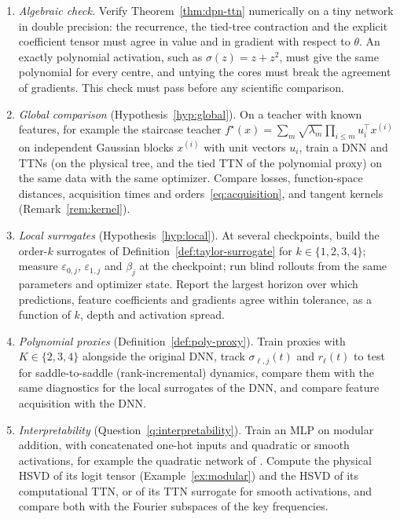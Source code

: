 \documentclass[11pt]{article}
\theoremstyle{definition}
\numberwithin{equation}{section}
\begin{document}
\begin{enumerate}[label=E\arabic*.,start=0,leftmargin=*]
\item \emph{Algebraic check.} Verify Theorem~\ref{thm:dpn-ttn} numerically on a tiny network in double precision: the recurrence, the tied-tree contraction and the explicit coefficient tensor must agree in value and in gradient with respect to $\theta$. An exactly polynomial activation, such as $\sigma(z)=z+z^2$, must give the same polynomial for every centre, and untying the cores must break the agreement of gradients. This check must pass before any scientific comparison.
\item \emph{Global comparison} (Hypothesis~\ref{hyp:global}). On a teacher with known features, for example the staircase teacher $f^\star(x)=\sum_m\sqrt{\lambda_m}\prod_{i\le m}u_i^\top x^{(i)}$ on independent Gaussian blocks $x^{(i)}$ with unit vectors $u_i$, train a DNN and TTNs (on the physical tree, and the tied TTN of the polynomial proxy) on the same data with the same optimizer. Compare losses, function-space distances, acquisition times and orders~\eqref{eq:acquisition}, and tangent kernels (Remark~\ref{rem:kernel}).
\item \emph{Local surrogates} (Hypothesis~\ref{hyp:local}). At several checkpoints, build the order-$k$ surrogates of Definition~\ref{def:taylor-surrogate} for $k\in\{1,2,3,4\}$; measure $\varepsilon_{0,j}$, $\varepsilon_{1,j}$ and $\beta_j$ at the checkpoint; run blind rollouts from the same parameters and optimizer state. Report the largest horizon over which predictions, feature coefficients and gradients agree within tolerance, as a function of $k$, depth and activation spread.
\item \emph{Polynomial proxies} (Definition~\ref{def:poly-proxy}). Train proxies with $K\in\{2,3,4\}$ alongside the original DNN, track $\sigma_{\ell,j}(t)$ and $r_\ell(t)$ to test for saddle-to-saddle (rank-incremental) dynamics, compare them with the same diagnostics for the local surrogates of the DNN, and compare feature acquisition with the DNN.
\item \emph{Interpretability} (Question~\ref{q:interpretability}). Train an MLP on modular addition, with concatenated one-hot inputs and quadratic or smooth activations, for example the quadratic network of \citet{gromov2023grokking}. Compute the physical HSVD of its logit tensor (Example~\ref{ex:modular}) and the HSVD of its computational TTN, or of its TTN surrogate for smooth activations, and compare both with the Fourier subspaces of the key frequencies.
\end{enumerate}
\end{document}
